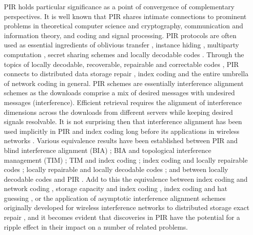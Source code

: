 
PIR holds particular significance as a point of convergence of complementary perspectives. 
It is well known that PIR shares intimate connections to prominent problems in theoretical computer science and cryptography, communication and information theory, and coding and signal processing. PIR protocols are often used as essential ingredients of oblivious transfer \cite{SymPIR}, instance hiding \cite{Hide, Hide_one, Hide_multiple},  multiparty computation \cite{Local_random}, secret sharing schemes \cite{Shamir, Beimel_Ishai_Kushilevitz_Orlov} and locally decodable codes \cite{YekhaninPhd}. Through the  topics of locally decodable, recoverable, repairable and correctable codes \cite{Gopalan_Huang_Simitci_Yekhanin}, PIR connects to  distributed data storage repair \cite{Dimakis_survey}, index coding \cite{Birk_Kol_Trans} and the entire umbrella of  network coding \cite{Ahlswede_Cai_etal} in general. PIR schemes are essentially interference alignment schemes \cite{Jafar_FnT} as the downloads comprise a mix of desired messages with undesired messages (interference). Efficient retrieval requires the alignment of interference dimensions across the downloads from different servers while keeping desired signals resolvable. It is not surprising then that interference alignment has been used implicitly in  PIR and index coding long before its applications in wireless networks \cite{Jafar_FnT}. Various equivalence results have been established between PIR and blind interference alignment (BIA) \cite{Sun_Jafar_PIR, Sun_Jafar_BIAPIR}; BIA and topological interference management (TIM) \cite{Jafar_TIM}; TIM and index coding \cite{Jafar_TIM}; index coding and locally repairable codes \cite{Shanmugam_Dimakis_LRC,Mazumdar_LRC}; locally repairable and locally decodable codes \cite{Gopalan_Huang_Simitci_Yekhanin}; and between locally decodable codes and PIR \cite{YekhaninPhd}. Add to this the equivalence between index coding and network coding  \cite{Rouayheb_Sprintson_Georghiades, Effros_Rouayheb_Langberg}, storage capacity and index coding \cite{Mazumdar}, index coding and hat guessing \cite{Riis_Hat}, or the application of asymptotic interference alignment schemes originally developed for wireless interference networks \cite{Cadambe_Jafar_int} to distributed storage exact repair \cite{Cadambe_Jafar_Maleki_Ramchandran_Suh}, and it becomes evident that discoveries in PIR have the potential for a ripple effect in their impact on a number of related problems.

